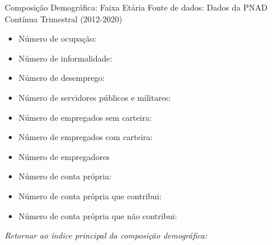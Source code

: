 \begin{frame}[label=_composicao_demografica_faixa_etaria]{Composição Demográfica: Faixa Etária}
{\footnotesize Fonte de dados: Dados da PNAD Contínua Trimestral (2012-2020)}
\begin{itemize}
\item{Número de ocupação: \hyperlink{_composicao_demografica_faixa_etaria_n_de_ocupacao}{}}
\item{Número de informalidade: \hyperlink{_composicao_demografica_faixa_etaria_n_de_informalidade}{}}
\item{Número de desemprego: \hyperlink{_composicao_demografica_faixa_etaria_n_de_desemprego}{}}
\item{Número de servidores públicos e militares: \hyperlink{_composicao_demografica_faixa_etaria_n_militar}{}}
\item{Número de empregados sem carteira: \hyperlink{_composicao_demografica_faixa_etaria_n_empregadoSC}{}}
\item{Número de empregados com carteira: \hyperlink{_composicao_demografica_faixa_etaria_n_empregadoCC}{}}
\item{Número de empregadores \hyperlink{_composicao_demografica_faixa_etaria_n_empregador}{}}
\item{Número de conta própria: \hyperlink{_composicao_demografica_faixa_etaria_n_cpropria}{}}
\item{Número de conta própria que contribui: \hyperlink{_composicao_demografica_faixa_etaria_n_cpropriaC}{}}
\item{Número de conta própria que não contribui: \hyperlink{_composicao_demografica_faixa_etaria_n_cpropriaNc}{}}
\end{itemize}

\begin{small}
\textit{Retornar ao índice principal da composição demográfica: \hyperlink{_composicao_demografica}{} }
\end{small}

\end{frame}

